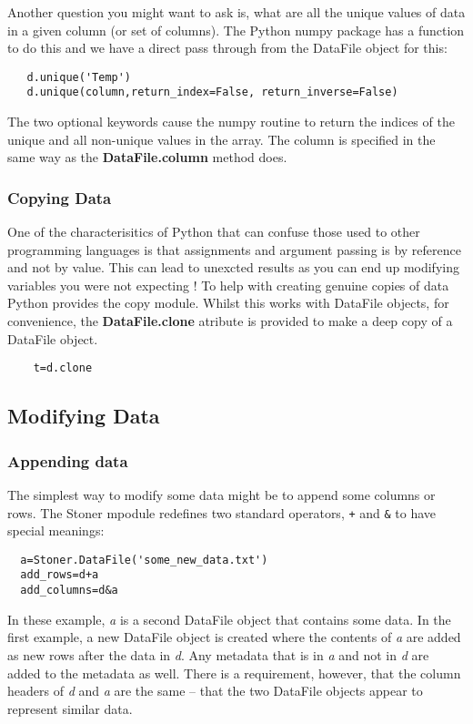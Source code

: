 \documentclass[a4paper,11pt]{scrartcl}
\begin{document}
Another question you might want to ask is, what are all the unique
values of data in a given column (or set of columns). The Python numpy
package has a function to do this and we have a direct pass through
from the DataFile object for this:

\begin{lstlisting}
   d.unique('Temp')
   d.unique(column,return_index=False, return_inverse=False)
\end{lstlisting}

The two optional keywords cause the numpy routine to return the
indices of the unique and all non-unique values in the array. The
column is specified in the same way as the \textbf{DataFile.column}
method does.

\subsubsection{Copying Data}

One of the characterisitics of Python that can confuse those used to other
programming languages is that assignments and argument passing is by reference
and not by value. This can lead to unexcted results as you can end up modifying variables you were not expecting ! To help with creating genuine copies of data Python provides the copy module. Whilst this works with DataFile objects, for convenience, the \textbf{DataFile.clone} atribute is provided to make a deep copy of a DataFile object.


\begin{lstlisting}
    t=d.clone
\end{lstlisting}


\subsection{Modifying Data}

\subsubsection{Appending data}

The simplest way to modify some data might be to append some columns or rows.
The Stoner mpodule redefines two standard operators, \verb:+: and \verb:&: to
have special meanings:
\begin{lstlisting}
  a=Stoner.DataFile('some_new_data.txt')
  add_rows=d+a
  add_columns=d&a
\end{lstlisting}
In these example, \textit{a} is a second DataFile object that contains some
data. In the first example, a new DataFile object is created where the contents
of \textit{a} are added as new rows after the data in \textit{d}. Any metadata
that is in \textit{a} and not in \textit{d} are added to the metadata as well.
There is a requirement, however, that the column headers of \textit{d} and
\textit{a} are the same -- \ie that the two DataFile objects appear to represent
similar data.
\end{document}
